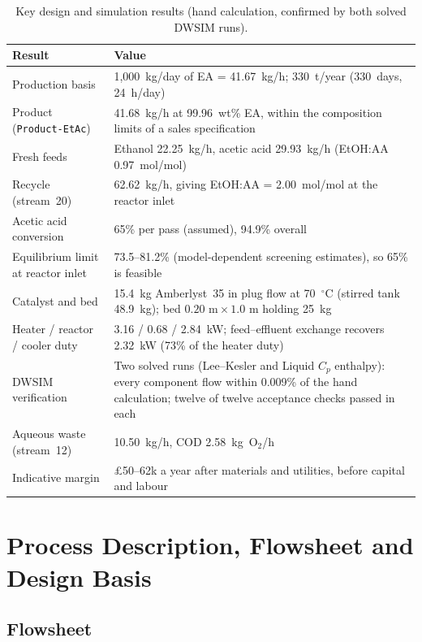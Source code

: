 \documentclass[10pt,a4paper]{article}
\newcommand{\hdrrow}{}
\begin{document}
\begin{table}[H]
\centering
\caption{Key design and simulation results (hand calculation, confirmed by both solved DWSIM runs).}
\label{tab:key_results}
\small
\begin{tabularx}{\textwidth}{|L{4.5cm}|Y|}
\hline
\hdrrow
\textbf{Result} & \textbf{Value} \\
\hline
Production basis & 1,000~kg/day of EA = 41.67~kg/h; 330~t/year (330~days, 24~h/day) \\
\hline
Product (\texttt{Product-EtAc}) & 41.68~kg/h at 99.96~wt\% EA, within the composition limits of a sales specification~\cite{ref3} \\
\hline
Fresh feeds & Ethanol 22.25~kg/h, acetic acid 29.93~kg/h (EtOH:AA 0.97~mol/mol) \\
\hline
Recycle (stream~20) & 62.62~kg/h, giving EtOH:AA = 2.00~mol/mol at the reactor inlet \\
\hline
Acetic acid conversion & 65\% per pass (assumed), 94.9\% overall \\
\hline
Equilibrium limit at reactor inlet & 73.5--81.2\% (model-dependent screening estimates), so 65\% is feasible \\
\hline
Catalyst and bed & 15.4~kg Amberlyst~35 in plug flow at 70~$^\circ$C (stirred tank 48.9~kg); bed $0.20\text{ m} \times 1.0\text{ m}$ holding 25~kg \\
\hline
Heater / reactor / cooler duty & 3.16 / 0.68 / 2.84~kW; feed--effluent exchange recovers 2.32~kW (73\% of the heater duty) \\
\hline
DWSIM verification & Two solved runs (Lee--Kesler and Liquid $C_p$ enthalpy): every component flow within 0.009\% of the hand calculation; twelve of twelve acceptance checks passed in each \\
\hline
Aqueous waste (stream~12) & 10.50~kg/h, COD 2.58~kg~O$_2$/h \\
\hline
Indicative margin & \pounds 50--62k a year after materials and utilities, before capital and labour \\
\hline
\end{tabularx}
\end{table}

\section{Process Description, Flowsheet and Design Basis}

\subsection{Flowsheet}
\end{document}
